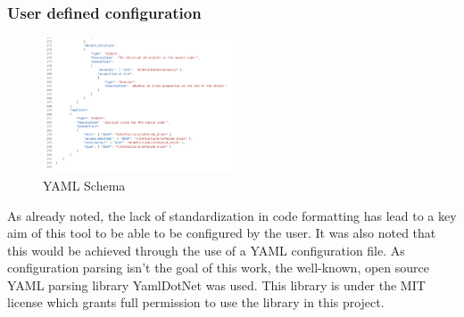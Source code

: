 \newpage

\subsubsection{User defined configuration}

\begin{figure}
    \centering
    \caption{YAML Schema}
    \label{fig:YAMLSchema}
    \includegraphics[width=0.5\textwidth]{Figures/YAMLSchemaCropped.png}
\end{figure}


As already noted, the lack of standardization in code formatting has lead to a key aim of this tool to be able to be configured by the user. It was also noted that this would be achieved through the use of a YAML configuration file. As configuration parsing isn't the goal of this work, the well-known, open source YAML parsing library YamlDotNet was used. This library is under the MIT license which grants full permission to use the library in this project.

